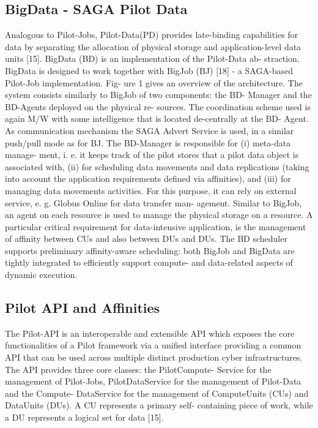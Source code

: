 \documentclass[12pt]{report}
\begin{document}
\subsection{BigData - SAGA Pilot Data} \label{sec:pd}
Analogous to Pilot-Jobs, Pilot-Data(PD) provides late-binding capabilities for data by separating the allocation of physical storage and application-level data units [15].
BigData (BD) is an implementation of the Pilot-Data ab- straction. BigData is designed to work together with BigJob (BJ) [18] - a SAGA-based Pilot-Job implementation. Fig- ure 1 gives an overview of the architecture. The system consists similarly to BigJob of two components: the BD- Manager and the BD-Agents deployed on the physical re- sources. The coordination scheme used is again M/W with some intelligence that is located de-centrally at the BD- Agent. As communication mechanism the SAGA Advert Service is used, in a similar push/pull mode as for BJ. The BD-Manager is responsible for (i) meta-data manage- ment, i. e. it keeps track of the pilot stores that a pilot data object is associated with, (ii) for scheduling data movements and data replications (taking into account the application requirements defined via affinities), and (iii) for managing data movements activities. For this purpose, it can rely on external service, e. g. Globus Online for data transfer man- agement. Similar to BigJob, an agent on each resource is used to manage the physical storage on a resource. A particular critical requirement for data-intensive application, is the management of affinity between CUs and also between DUs and DUs. The BD scheduler supports preliminary affinity-aware scheduling: both BigJob and BigData are tightly integrated to efficiently support compute- and data-related aspects of dynamic execution.

\subsection{Pilot API and Affinities} \label{sec:pilot-api}
The Pilot-API is an interoperable and extensible API which exposes the core functionalities of a Pilot framework via a unified interface providing a common API that can be used across multiple distinct production cyber infrastructures. The API provides three core classes: the PilotCompute- Service for the management of Pilot-Jobs, PilotDataService for the management of Pilot-Data and the Compute- DataService for the management of ComputeUnits (CUs) and DataUnits (DUs). A CU represents a primary self- containing piece of work, while a DU represents a logical set for data [15].
\end{document}
